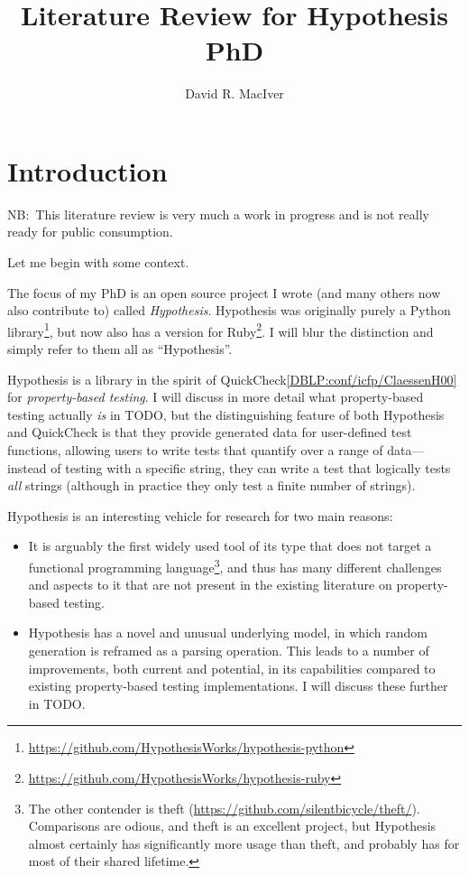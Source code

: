

\title{Literature Review for Hypothesis PhD}
\author{David R. MacIver}



\maketitle

\tableofcontents

\chapter{Introduction}

NB:\ This literature review is very much a work in progress and is not really ready for public consumption.

Let me begin with some context.

The focus of my PhD is an open source project I wrote (and many others now also contribute to) called \emph{Hypothesis}.
Hypothesis was originally purely a Python library\footnote{\url{https://github.com/HypothesisWorks/hypothesis-python}},
but now also has a version for Ruby\footnote{\url{https://github.com/HypothesisWorks/hypothesis-ruby}}.
I will blur the distinction and simply refer to them all as ``Hypothesis''.

Hypothesis is a library in the spirit of QuickCheck\ref{DBLP:conf/icfp/ClaessenH00} for \emph{property-based testing}.
I will discuss in more detail what property-based testing actually \emph{is} in TODO,
but the distinguishing feature of both Hypothesis and QuickCheck is that they provide generated data for user-defined test functions,
allowing users to write tests that quantify over a range of data---instead
of testing with a specific string,
they can write a test that logically tests \emph{all} strings (although in practice they only test a finite number of strings).

Hypothesis is an interesting vehicle for research for two main reasons:

\begin{itemize}
\item It is arguably the first widely used tool of its type that does not target a functional programming language\footnote{
The other contender is theft (\url{https://github.com/silentbicycle/theft/}).
Comparisons are odious,
and theft is an excellent project,
but Hypothesis almost certainly has significantly more usage than theft,
and probably has for most of their shared lifetime.
},
and thus has many different challenges and aspects to it that are not present in the existing literature on property-based testing.
\item Hypothesis has a novel and unusual underlying model,
in which random generation is reframed as a parsing operation.
This leads to a number of improvements,
both current and potential,
in its capabilities compared to existing property-based testing implementations.
I will discuss these further in TODO.\ 
\end{itemize}

